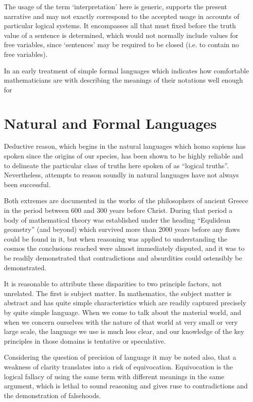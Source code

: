 \documentclass[10pt,titlepage]{article}
\begin{document}
The usage of the term `interpretation' here is generic, supports the present narrative and may not exactly correspond to the accepted usage in accounts of particular logical systems.
It encompasses all that must fixed before the truth value of a sentence is determined, which would not normally include values for free variables, since `sentences' may be required to be closed (i.e. to contain no free variables).

In an early treatment of simple formal languages which indicates how comfortable mathematicians are with describing the meanings of their notations well enough for 

\cite{heijenoort67,post21,godel30a,tarski31,tarski56,carnap47}

\section{Natural and Formal Languages}

Deductive reason, which begins in the natural languages which homo sapiens has spoken since the origins of our species, has been shown to be highly reliable and to delineate the particular class of truths here spoken of as ``logical truths''.
Nevertheless, attempts to reason soundly in natural languages have not always been successful.

Both extremes are documented in the works of the philosophers of ancient Greece in the period between 600 and 300 years before Christ.
During that period a body of mathematical theory was established under the heading ``Equlidean geometry'' (and beyond) which survived more than 2000 years before any flaws could be found in it, but when reasoning was applied to understanding the cosmos the conclusions reached were almost immediately disputed, and it was to be readily demonstrated that contradictions and absurdities could ostensibly be demonstrated.

It is reasonable to attribute these disparities to two principle factors, not unrelated.
The first is subject matter.
In mathematics, the subject matter is abstract and has quite simple characteristics which are readily captured precisely by quite simple language.
When we come to talk about the material world, and when we concern ourselves with the nature of that world at very small or very large scale, the language we use is much less clear, and our knowledge of the key principles in those domains is tentative or speculative.

Considering the question of precision of language it may be noted also, that a weakness of clarity translates into a risk of equivocation.
Equivocation is the logical fallacy of using the same term with different meanings in the same argument, which is lethal to sound reasoning and gives ruse to contradictions and the demonstration of falsehoods.
\end{document}
